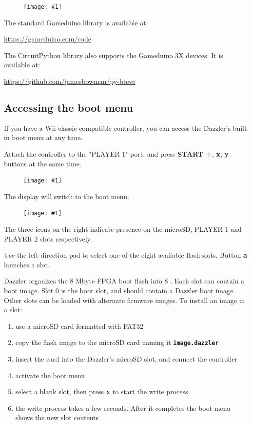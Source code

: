 \documentclass{article}
\newcommand{\pngw}[2]{
\begin{figure}[H]
\begin{center}
\texttt{[image: \#1]}
\end{center}
\end{figure}
}
\newcommand{\mach}[1]{\texttt{\textbf{#1}}}
\begin{document}
\pngw{img/gameduino-3x-dazzler/helloworld}{1.0}

The standard Gameduino library is available at:

\url{https://gameduino.com/code}

The CircuitPython library also supports the Gameduino 3X devices.
It is available at:

\url{https://github.com/jamesbowman/py-bteve}

\newpage
\subsection{Accessing the boot menu}\label{sec:bootmenu}

If you have a Wii-classic compatible controller,
you can access the Dazzler's built-in boot menu at any time.

Attach the controller to the "PLAYER 1" port, and press
\textbf{START +},
\textbf{x},
\textbf{y} buttons at the same time.

\pngw{img/gameduino-3x-dazzler/wii-bootmenu.png}{0.5}

The display will switch to the boot menu.

\pngw{img/gameduino-3x-dazzler/bootmenu1.png}{0.7}

The three icons on the right indicate presence on the
microSD, PLAYER 1 and PLAYER 2 slots respectively.

Use the left-direction pad to select one of the eight available flash slots.
Button \textbf{a} launches a slot.

Dazzler organizes the 8 Mbyte FPGA boot flash into 8 .
Each slot can contain a boot image.
Slot 0 is the boot slot, and should contain a Dazzler boot image. Other slots can be loaded with alternate firmware images.
To install an image in a slot: 
\begin{enumerate}

\item use a microSD card formatted with FAT32

\item copy the flash image to the microSD card naming it \mach{image.dazzler}

\item insert the card into the Dazzler's microSD slot, and connect the controller

\item activate the boot menu

\item select a blank slot, then press \textbf{x} to start the write process

\item the write process takes a few seconds.
After it completes the boot menu shows the new slot contents

\end{enumerate}
\end{document}
